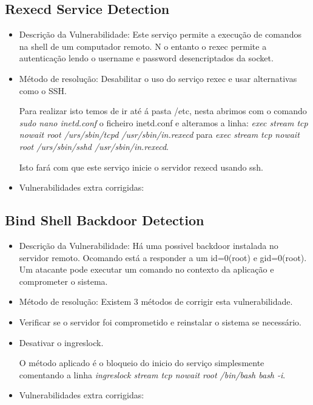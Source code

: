 \subsection{Rexecd Service Detection}

\begin{itemize}
\item Descrição da Vulnerabilidade: Este serviço permite a execução de comandos na shell de um computador remoto. N o entanto o rexec permite a autenticação lendo o username e password desencriptados da socket.

\item Método de resolução: Desabilitar o uso do serviço rexec e usar alternativas como o SSH.
\par Para realizar isto temos de ir até á pasta /etc, nesta abrimos com o comando \textit{sudo nano inetd.conf} o ficheiro inetd.conf e alteramos a linha: \textit{exec   stream    tcp  nowait  root /urs/sbin/tcpd  /usr/sbin/in.rexecd} para \textit{exec   stream    tcp  nowait  root /urs/sbin/sshd  /usr/sbin/in.rexecd}.
\par Isto fará com que este serviço inicie o servidor rexecd usando ssh. 

\item Vulnerabilidades extra corrigidas:
\end{itemize}

\subsection{Bind Shell Backdoor Detection}

\begin{itemize}
\item Descrição da Vulnerabilidade: Há uma possivel backdoor instalada no servidor remoto. Ocomando está a responder a um id=0(root) e gid=0(root). Um atacante pode executar um comando no contexto da aplicação e comprometer o sistema.

\item Método de resolução: Existem 3 métodos de corrigir esta vulnerabilidade.

\par\item Verificar se o servidor foi comprometido e reinstalar o sistema se necessário. 
\par\item Desativar o ingreslock.
\par O método aplicado é o bloqueio do inicio do serviço simplesmente comentando a linha \textit{ingreslock stream tcp nowait root /bin/bash bash -i}.

\item Vulnerabilidades extra corrigidas:
\end{itemize}

